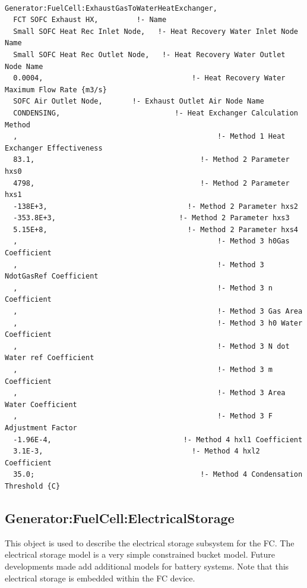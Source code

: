 \begin{lstlisting}

Generator:FuelCell:ExhaustGasToWaterHeatExchanger,
  FCT SOFC Exhaust HX,         !- Name
  Small SOFC Heat Rec Inlet Node,   !- Heat Recovery Water Inlet Node Name
  Small SOFC Heat Rec Outlet Node,   !- Heat Recovery Water Outlet Node Name
  0.0004,                                   !- Heat Recovery Water Maximum Flow Rate {m3/s}
  SOFC Air Outlet Node,       !- Exhaust Outlet Air Node Name
  CONDENSING,                           !- Heat Exchanger Calculation Method
  ,                                               !- Method 1 Heat Exchanger Effectiveness
  83.1,                                       !- Method 2 Parameter hxs0
  4798,                                       !- Method 2 Parameter hxs1
  -138E+3,                                 !- Method 2 Parameter hxs2
  -353.8E+3,                             !- Method 2 Parameter hxs3
  5.15E+8,                                 !- Method 2 Parameter hxs4
  ,                                               !- Method 3 h0Gas Coefficient
  ,                                               !- Method 3 NdotGasRef Coefficient
  ,                                               !- Method 3 n Coefficient
  ,                                               !- Method 3 Gas Area
  ,                                               !- Method 3 h0 Water Coefficient
  ,                                               !- Method 3 N dot Water ref Coefficient
  ,                                               !- Method 3 m Coefficient
  ,                                               !- Method 3 Area Water Coefficient
  ,                                               !- Method 3 F Adjustment Factor
  -1.96E-4,                               !- Method 4 hxl1 Coefficient
  3.1E-3,                                   !- Method 4 hxl2 Coefficient
  35.0;                                       !- Method 4 Condensation Threshold {C}
\end{lstlisting}

\subsection{Generator:FuelCell:ElectricalStorage}\label{generatorfuelcellelectricalstorage}

This object is used to describe the electrical storage subsystem for the FC. The electrical storage model is a very simple constrained bucket model. Future developments made add additional models for battery systems. Note that this electrical storage is embedded within the FC device.

